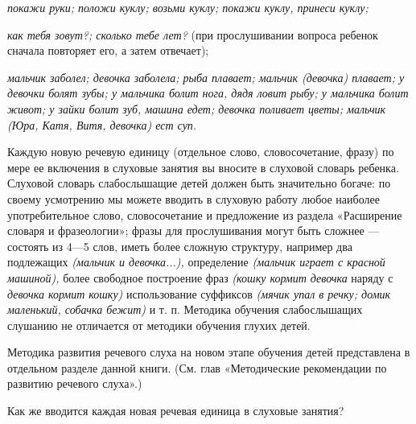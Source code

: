 \documentclass[a5paper]{book}
\renewcommand{\emph}[1]{\textit{#1}}
\begin{document}
\emph{покажи руки; положи куклу; возьми куклу; покажи куклу, принеси
куклу;}

\emph{как тебя зовут?; сколько тебе лет?} (при прослушивании вопроса
ребенок сначала повторяет его, а затем отвечает);

\emph{мальчик заболел; девочка заболела; рыба плавает; мальчик (девочка)
плавает; у девочки болят зубы; у мальчика болит нога, дядя ловит рыбу; у
мальчика болит живот; у зайки болит зуб, машина едет; девочка поливает
цветы; мальчик (Юра, Катя, Витя, девочка) ест суп.}

Каждую новую речевую единицу (отдельное слово, словосочетание, фразу) по
мере ее включения в слуховые занятия вы вносите в слуховой словарь
ребенка. Слуховой словарь слабослышащие детей должен быть значительно
богаче: по своему усмотрению мы можете вводить в слуховую работу любое
наиболее употребительное слово, словосочетание и предложение из раздела
«Расширение словаря и фразеологии»; фразы для прослушивания могут быть
сложнее --- состоять из 4---5 слов, иметь более сложную структуру,
например два подлежащих \emph{(мальчик и девочка...),} определение
\emph{(мальчик играет с красной машиной),} более свободное построение
фраз \emph{(кошку кормит девочка} наряду с \emph{девочка кормит кошку)}
использование суффиксов \emph{(мячик упал в речку; домик маленький,
собачка бежит)} и т. п. Методика обучения слабослышащих слушанию не
отличается от методики обучения глухих детей.

Методика развития речевого слуха на новом этапе обучения детей
представлена в отдельном разделе данной книги. (См. глав «Методические
рекомендации по развитию речевого слуха».)

Как же вводится каждая новая речевая единица в слуховые занятия?
\end{document}
